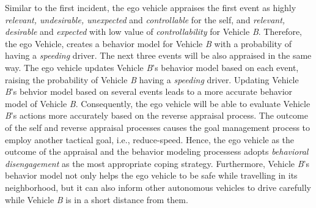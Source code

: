 \documentclass[journal, 11pt]{IEEEtran}
\begin{document}
Similar to the first incident, the ego vehicle appraises the first event as
highly \textit{relevant, undesirable, unexpected} and \textit{controllable} for
the self, and \textit{relevant, desirable} and \textit{expected} with low value
of \textit{controllability} for Vehicle \textit{B}. Therefore, the ego Vehicle,
creates a behavior model for Vehicle \textit{B} with a probability of having
a \textit{speeding} driver. The next three events will be also appraised in the
same way. The ego vehicle updates Vehicle \textit{B}'s behavior model based on
each event, raising the probability of Vehicle \textit{B} having a
\textit{speeding} driver. Updating Vehicle \textit{B}'s behvior model based on
several events leads to a more accurate behavior model of Vehicle \textit{B}.
Consequently, the ego vehicle will be able to evaluate Vehicle \textit{B}'s
actions more accurately based on the reverse appraisal process. The outcome of
the self and reverse appraisal processes causes the goal management process to
employ another tactical goal, i.e., reduce-speed. Hence, the ego vehicle as the
outcome of the appraisal and the behavior modeling processess adopts
\textit{behavioral disengagement} as the most appropriate coping strategy.
Furthermore, Vehicle \textit{B}'s behavior model not only helps the ego vehicle
to be safe while travelling in its neighborhood, but it can also inform other
autonomous vehicles to drive carefully while Vehicle \textit{B} is in a short
distance from them.
\end{document}
